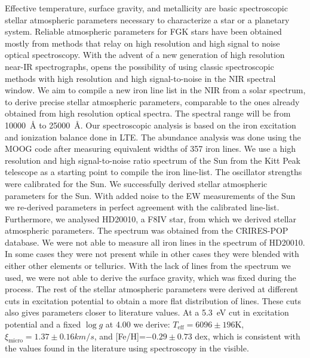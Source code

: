 \documentclass{aa}
\begin{document}
\abstract
{Effective temperature, surface gravity, and metallicity are basic
spectroscopic stellar atmospheric parameters necessary to characterize
a star or a planetary system. Reliable atmospheric parameters for
FGK stars have been obtained mostly from methods that relay on high
resolution and high signal to noise optical spectroscopy. With the
advent of a new generation of high resolution near-IR spectrographs,
opens the possibility of using classic spectroscopic methods with
high resolution and high signal-to-noise in the NIR spectral window.}
{We aim to compile a new iron line list in the NIR from a solar
spectrum, to derive precise stellar atmospheric parameters,
comparable to the ones already obtained from high resolution optical
spectra. The spectral range will be from \SI{10000}{\angstrom} to
\SI{25000}{\angstrom}.}
{Our spectroscopic analysis is based on the iron excitation and
ionization balance done in LTE. The abundance analysis was done using the MOOG code
after measuring equivalent widths of 357 iron lines. We use a high
resolution and high signal-to-noise ratio spectrum of the Sun from the
Kitt Peak telescope \citep{Hinkle1995} as a starting point to compile
the iron line-list. The oscillator strengths were calibrated for the
Sun.}
{We successfully derived stellar atmospheric parameters for the Sun.
With added noise to the EW measurements of the Sun we re-derived
parameters in perfect agreement with the calibrated line-list.
Furthermore, we analysed HD20010, a F8IV star, from which we derived
stellar atmospheric parameters. The spectrum was obtained from the
CRIRES-POP database. We were not able to measure all iron lines in
the spectrum of HD20010. In some cases they were not present while in
other cases they were blended with either other elements or tellurics.
With the lack of  lines from the spectrum we used, we were
not able to derive the surface gravity, which was fixed during the
process. The rest of the stellar atmospheric parameters were derived at
different cuts in excitation potential to obtain a more flat distribution
of lines. These cuts also gives parameters closer
to literature values. At a \SI{5.3}{eV} cut in excitation potential
and a fixed $\log g$ at 4.00 we derive: $T_\mathrm{eff}=6096\pm196$K,
$\xi_\mathrm{micro}=1.37\pm0.16\si{km/s}$, and [Fe/H]=$-0.29\pm0.73$
dex, which is consistent with the values found in the literature using
spectroscopy in the visible.}
{}



\maketitle
\end{document}
